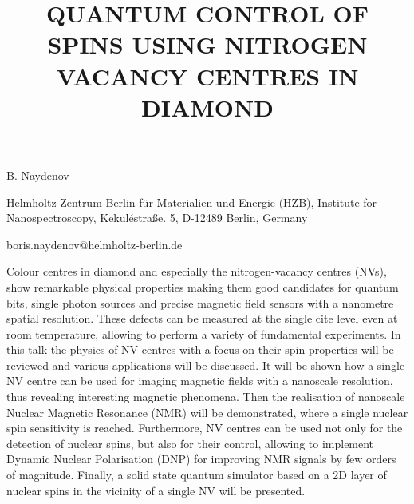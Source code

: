 \title{QUANTUM CONTROL OF SPINS USING NITROGEN VACANCY CENTRES IN DIAMOND}

\underline{B. Naydenov}  

{\normalsize{\vspace{-4mm}
Helmholtz-Zentrum Berlin für Materialien und Energie (HZB),
Institute for Nanospectroscopy,
Kekuléstraße. 5,
D-12489 Berlin,
Germany



\email boris.naydenov@helmholtz-berlin.de}}

Colour centres in diamond and especially the nitrogen-vacancy centres (NVs), show remarkable physical properties making them good candidates for quantum bits, single photon sources and precise magnetic field sensors with a nanometre spatial resolution. These defects can be measured at the single cite level even at room temperature, allowing to perform a variety of fundamental experiments.
In this talk the physics of NV centres with a focus on their spin properties will be reviewed and various applications will be discussed. It will be shown how a single NV centre can be used for imaging magnetic fields with a nanoscale resolution, thus revealing interesting magnetic phenomena. Then the realisation of nanoscale Nuclear Magnetic Resonance (NMR) will be demonstrated, where a single nuclear spin sensitivity is reached. Furthermore, NV centres can be used not only for the detection of nuclear spins, but also for their control, allowing to implement Dynamic Nuclear Polarisation (DNP) for improving NMR signals by few orders of magnitude. Finally, a solid state quantum simulator based on a 2D layer of nuclear spins in the vicinity of a single NV will be presented. 

\vspace{\baselineskip}